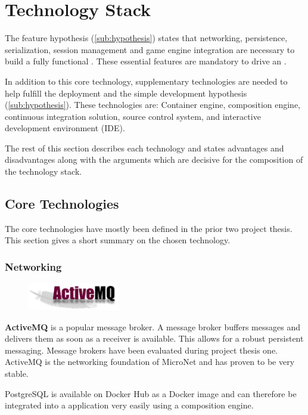 \section{Technology Stack}

The feature hypothesis (\autoref{sub:hypothesis}) states that networking,
persistence, serialization, session management and game engine integration are
necessary to build a fully functional \og{}. These essential features are
mandatory to drive an \og{}.

In addition to this core technology, supplementary technologies are needed to
help fulfill the deployment and the simple development hypothesis
(\autoref{sub:hypothesis}). These technologies are: Container engine,
composition engine, continuous integration solution, source control system, and
interactive development environment (IDE).

The rest of this section describes each technology and states advantages and
disadvantages along with the arguments which are decisive for the composition
of the technology stack.

\subsection{Core Technologies}

The core technologies have mostly been defined in the prior two project thesis.
This section gives a short summary on the chosen technology.

\subsubsection{Networking}

\begin{figure}
    \includegraphics[width=4cm]{images/dependencies/activemq}
\end{figure}

\textbf{ActiveMQ} is a popular message broker. A message broker buffers
messages and delivers them as soon as a receiver is available. This allows for a
robust persistent messaging. Message brokers have been evaluated during
project thesis one. ActiveMQ is the networking foundation of MicroNet and
has proven to be very stable.

PostgreSQL is available on Docker Hub as a Docker image and can therefore
be integrated into a \ms{} application very easily using a composition engine.




